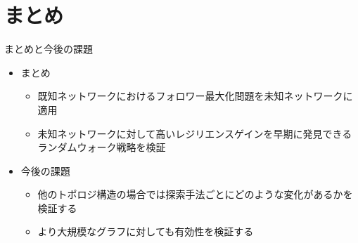 \documentclass[compress,dvipdfmx,11pt]{beamer}
\begin{document}
\section{まとめ}
\label{sec:org4b3d7d5}
\begin{frame}[label={sec:orgeadf93c}]{まとめと今後の課題}
\begin{itemize}
\item まとめ
\begin{itemize}
\item 既知ネットワークにおけるフォロワー最大化問題を未知ネットワークに適用
\item 未知ネットワークに対して高いレジリエンスゲインを早期に発見できるランダムウォーク戦略を検証
\end{itemize}

\item 今後の課題
\begin{itemize}
\item 他のトポロジ構造の場合では探索手法ごとにどのような変化があるかを検証する
\item より大規模なグラフに対しても有効性を検証する
\end{itemize}
\end{itemize}
\end{frame}
\end{document}
